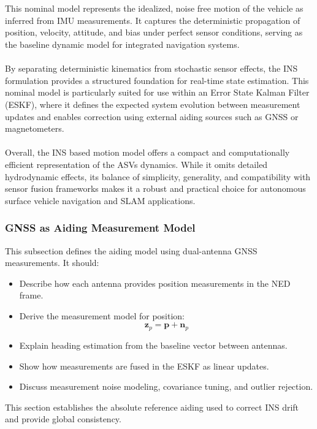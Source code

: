 \\ \\
This nominal model represents the idealized, noise free motion of the vehicle as inferred from IMU measurements. It captures the deterministic propagation of position, velocity, attitude, and bias under perfect sensor conditions, serving as the baseline dynamic model for integrated navigation systems.  
\\ \\
By separating deterministic kinematics from stochastic sensor effects, the INS formulation provides a structured foundation for real-time state estimation. This nominal model is particularly suited for use within an Error State Kalman Filter (ESKF), where it defines the expected system evolution between measurement updates and enables correction using external aiding sources such as GNSS or magnetometers.  
\\ \\
Overall, the INS based motion model offers a compact and computationally efficient representation of the ASVs dynamics. While it omits detailed hydrodynamic effects, its balance of simplicity, generality, and compatibility with sensor fusion frameworks makes it a robust and practical choice for autonomous surface vehicle navigation and SLAM applications.



\subsubsection{GNSS as Aiding Measurement Model}
This subsection defines the aiding model using dual-antenna GNSS measurements. It should:
\begin{itemize}
    \item Describe how each antenna provides position measurements in the NED frame.
    \item Derive the measurement model for position:
    $$
    \mathbf{z}_p = \mathbf{p} + \mathbf{n}_p
    $$
    \item Explain heading estimation from the baseline vector between antennas.
    \item Show how measurements are fused in the ESKF as linear updates.
    \item Discuss measurement noise modeling, covariance tuning, and outlier rejection.
\end{itemize}
This section establishes the absolute reference aiding used to correct INS drift and provide global consistency.



